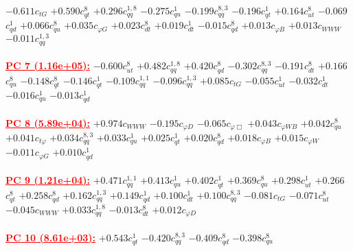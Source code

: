 \documentclass{article}
\begin{document}
{$-0.611$}{\rm $c_{tG}$}
{$+0.590$}{\rm $c_{qt}^{8}$}
{$+0.296$}{\rm $c_{qq}^{1,8}$}
{$-0.275$}{\rm $c_{qu}^{1}$}
{$-0.199$}{\rm $c_{qq}^{8,3}$}
{$-0.196$}{\rm $c_{qt}^{1}$}
{$+0.164$}{\rm $c_{ut}^{8}$}
{$-0.069$}{\rm $c_{qd}^{1}$}
{$+0.066$}{\rm $c_{qu}^{8}$}
{$+0.035$}{\rm $c_{\varphi G}$}
{$+0.023$}{\rm $c_{dt}^{8}$}
{$+0.019$}{\rm $c_{dt}^{1}$}
{$-0.015$}{\rm $c_{qd}^{8}$}
{$+0.013$}{\rm $c_{\varphi B}$}
{$+0.013$}{\rm $c_{WWW}$}
{$-0.011$}{\rm $c_{qq}^{1,3}$}
 \nonumber \\ \nonumber \\
\noindent \textcolor{red}{\underline{\bf{PC 7} (1.16e+05):}}
{$-0.600$}{\rm $c_{ut}^{8}$}
{$+0.482$}{\rm $c_{qq}^{1,8}$}
{$+0.420$}{\rm $c_{qd}^{8}$}
{$-0.302$}{\rm $c_{qq}^{8,3}$}
{$-0.191$}{\rm $c_{dt}^{8}$}
{$+0.166$}{\rm $c_{qu}^{8}$}
{$-0.148$}{\rm $c_{qt}^{8}$}
{$-0.146$}{\rm $c_{qt}^{1}$}
{$-0.109$}{\rm $c_{qq}^{1,1}$}
{$-0.096$}{\rm $c_{qq}^{1,3}$}
{$+0.085$}{\rm $c_{tG}$}
{$-0.055$}{\rm $c_{ut}^{1}$}
{$-0.032$}{\rm $c_{dt}^{1}$}
{$-0.016$}{\rm $c_{qu}^{1}$}
{$-0.013$}{\rm $c_{qd}^{1}$}
 \nonumber \\ \nonumber \\
\noindent \textcolor{red}{\underline{\bf{PC 8} (5.89e+04):}}
{$+0.974$}{\rm $c_{WWW}$}
{$-0.195$}{\rm $c_{\varphi D}$}
{$-0.065$}{\rm $c_{\varphi \Box}$}
{$+0.043$}{\rm $c_{\varphi WB}$}
{$+0.042$}{\rm $c_{qu}^{8}$}
{$+0.041$}{\rm $c_{t \varphi}$}
{$+0.034$}{\rm $c_{qq}^{8,3}$}
{$+0.033$}{\rm $c_{qu}^{1}$}
{$+0.025$}{\rm $c_{qt}^{1}$}
{$+0.020$}{\rm $c_{qd}^{8}$}
{$+0.018$}{\rm $c_{\varphi B}$}
{$+0.015$}{\rm $c_{\varphi W}$}
{$-0.011$}{\rm $c_{\varphi G}$}
{$+0.010$}{\rm $c_{qd}^{1}$}
 \nonumber \\ \nonumber \\
\noindent \textcolor{red}{\underline{\bf{PC 9} (1.21e+04):}}
{$+0.471$}{\rm $c_{qq}^{1,1}$}
{$+0.413$}{\rm $c_{qu}^{1}$}
{$+0.402$}{\rm $c_{qt}^{1}$}
{$+0.369$}{\rm $c_{qu}^{8}$}
{$+0.298$}{\rm $c_{ut}^{1}$}
{$+0.266$}{\rm $c_{qt}^{8}$}
{$+0.258$}{\rm $c_{qd}^{8}$}
{$+0.162$}{\rm $c_{qq}^{1,3}$}
{$+0.149$}{\rm $c_{qd}^{1}$}
{$+0.100$}{\rm $c_{dt}^{1}$}
{$+0.100$}{\rm $c_{qq}^{8,3}$}
{$-0.081$}{\rm $c_{tG}$}
{$-0.071$}{\rm $c_{ut}^{8}$}
{$-0.045$}{\rm $c_{WWW}$}
{$+0.033$}{\rm $c_{qq}^{1,8}$}
{$-0.013$}{\rm $c_{dt}^{8}$}
{$+0.012$}{\rm $c_{\varphi D}$}
 \nonumber \\ \nonumber \\
\noindent \textcolor{red}{\underline{\bf{PC 10} (8.61e+03):}}
{$+0.543$}{\rm $c_{qt}^{1}$}
{$-0.420$}{\rm $c_{qq}^{8,3}$}
{$-0.409$}{\rm $c_{qd}^{8}$}
{$-0.398$}{\rm $c_{qu}^{8}$}
\end{document}
